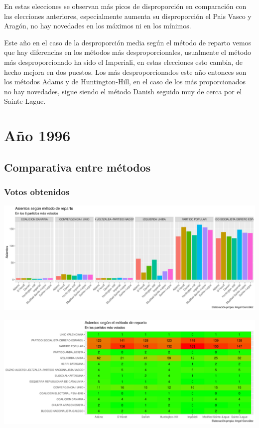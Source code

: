 \documentclass[12pt,a4paper,]{book}
\numberwithin{dummy}{section}
\theoremstyle{ocrenumbox}
\theoremstyle{blacknumex}
\theoremstyle{blacknumbox}
\theoremstyle{ocrenum}
\theoremstyle{ocrenum}
\begin{document}
En estas elecciones se observan más picos de disproporción en
comparación con las elecciones anteriores, especialmente aumenta su
disproporción el Pais Vasco y Aragón, no hay novedades en los máximos ni
en los mínimos.

Este año en el caso de la desproporción media según el método de reparto
vemos que hay diferencias en los métodos más desproporcionales,
usualmente el método más desproporcionado ha sido el Imperiali, en estas
elecciones esto cambia, de hecho mejora en dos puestos. Los más
desproporcionados este año entonces son los métodos Adams y de
Huntington-Hill, en el caso de los más proporcionados no hay novedades,
sigue siendo el método Danish seguido muy de cerca por el Sainte-Lague.

\hypertarget{auxf1o-1996}{%
\section{Año 1996}\label{auxf1o-1996}}

\hypertarget{comparativa-entre-muxe9todos-6}{%
\subsection{Comparativa entre
métodos}\label{comparativa-entre-muxe9todos-6}}

\hypertarget{votos-obtenidos-6}{%
\subsubsection{Votos obtenidos}\label{votos-obtenidos-6}}

\begin{center}\includegraphics[width=0.95\linewidth]{figurasR/unnamed-chunk-113-1} \end{center}

\begin{center}\includegraphics[width=0.95\linewidth]{figurasR/unnamed-chunk-113-2} \end{center}
\end{document}
